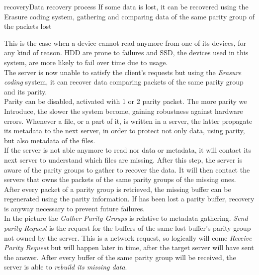 \begin{myimage}{recovery}{Data recovery process}
    If some data is lost, it can be recovered using the Erasure coding system,
    gathering and comparing data of the same parity group of the packets lost
\end{myimage}

This is the case when a device cannot read anymore from one of its devices, for
any kind of reason. HDD are prone to failures and SSD, the devices used in this
system, are more likely to fail over time due to usage. \\
The server is now unable to satisfy the client's requests
but using the \textit{Erasure coding} system, it can recover data comparing
packets of the same parity group and its parity. \\
Parity can be disabled, activated with 1 or 2 parity packet. The more parity we
Introduce, the slower the system become, gaining robustness against hardware errors.
Whenever a file, or a part of it, is written in a server, the latter propagate
its metadata to the next server, in order to protect not only data, using
parity, but also metadata of the files. \\
If the server is not able anymore to read nor data or metadata, it will contact
its next server to understand which files are missing. After this step, the
server is aware of the parity groups to gather to recover the data. It will then
contact the servers that owns the packets of the same parity groups of the
missing ones. \\
After every packet of a parity group is retrieved, the missing buffer can be
regenerated using the parity information. If has been lost a parity buffer,
recovery is anyway necessary to prevent future failures. \\
In the picture the \textit{Gather Parity Groups} is relative to metadata
gathering. \textit{Send parity Request} is the request for the buffers of the
same lost buffer's parity group not owned by the server. This is a network
request, so logically will come \textit{Receive Parity Request} but will happen
later in time, after the target server will have sent the answer.
After every buffer of the same parity group will be received, the server is able
to \textit{rebuild its missing data}.


